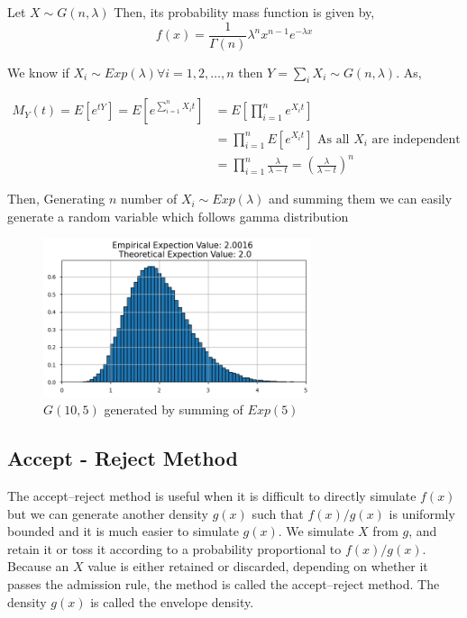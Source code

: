 \begin{example}
    Let $X\sim G(n,\lambda)$ Then, its probability  mass function is given by,
    \[
        f(x) = \frac{1}{\Gamma(n)}\lambda^{n}x^{n-1}e^{-\lambda x}
    \] 

    We know if $X_i\sim Exp(\lambda) \forall i = 1,2, \ldots ,n$ then  $Y=\sum_i X_i \sim G(n,\lambda)$. As, 

    \begin{align*}
        M_{Y}(t) = E \left[ e^{tY} \right] = E\left[ e^{\sum_{i=1}^{n} X_it  }\right] &= E\left[ \prod_{i=1}^{n} e^{X_it} \right]\\ 
                                                                                      &=\prod_{i=1}^{n} E\left[  e^{X_it} \right] \text{ As all $X_i$ are independent }\\ 
                                                                                      &= \prod_{i=1}^{n}\frac{\lambda}{\lambda-t} = \left( \frac{\lambda}{\lambda-t} \right)^{n} 
    \end{align*} 

    Then, Generating  $n$ number of $X_i\sim Exp(\lambda)$ 
    and summing them we can easily generate a random variable which follows gamma distribution
    \begin{figure}[H]
        
        \centering
        \includegraphics[width=0.7\textwidth]{images/gamma_ITA.png}
        \caption{$G(10,5)$ generated by summing of $Exp(5)$}
    \end{figure}
\end{example}

\subsection{Accept - Reject Method}
The accept–reject method is useful when it is difficult to directly simulate $f(x)$ but we can generate another density $g(x)$ such that $f(x)/g(x)$  
is uniformly bounded and it is much easier to simulate $g(x)$. We simulate  $X$ from  $g$, and retain it or toss it according 
to a probability proportional to $f(x)/g(x)$. 
Because an $X$ value is either retained
or discarded, depending on whether it passes the admission rule, the method is called
the accept–reject method. The density $g(x)$ is called the envelope density.


